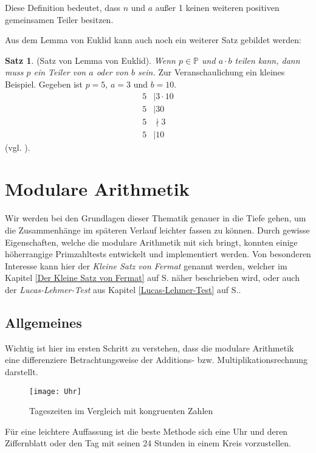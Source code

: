 \documentclass[12pt,a4paper]{article}
\theoremstyle{definition}
\newtheorem{satz}{Satz}[subsection]
\begin{document}
Diese Definition bedeutet, dass $n$ und $a$ außer 1 keinen weiteren positiven gemeinsamen Teiler besitzen.

Aus dem Lemma von Euklid kann auch noch ein weiterer Satz gebildet werden:
\begin{satz}(Satz von Lemma von Euklid).\newline
\textit{Wenn $p \in \mathbb{P}$ und $a \cdot b$ teilen kann, dann muss $p$ ein Teiler von $a$ oder von $b$ sein.}\newline
Zur Veranschaulichung ein kleines Beispiel. Gegeben ist $p = 5$, $a = 3$ und $b = 10$.
\begin{align}
5 &\mid 3 \cdot 10\\
5 &\mid 30\\
5 &\nmid 3\\
5 &\mid 10
\end{align}
(vgl. \cite[247]{Houston2012}).
\end{satz}
\newpage

\section{Modulare Arithmetik}\label{Modulare Arithmetik}
Wir werden bei den Grundlagen dieser Thematik genauer in die Tiefe gehen, um die Zusammenhänge im späteren Verlauf leichter fassen zu können. Durch gewisse Eigenschaften, welche die modulare Arithmetik mit sich bringt, konnten einige höherrangige Primzahltests entwickelt und implementiert werden. Von besonderen Interesse kann hier der \textit{Kleine Satz von Fermat} genannt werden, welcher im Kapitel \ref{Der Kleine Satz von Fermat} auf S. \pageref{Der Kleine Satz von Fermat} näher beschrieben wird, oder auch der \textit{Lucas-Lehmer-Test} aus Kapitel \ref{Lucas-Lehmer-Test} auf S.\pageref{Lucas-Lehmer-Test}.

\subsection{Allgemeines}\label{Allgemeines}
Wichtig ist hier im ersten Schritt zu verstehen, dass die modulare Arithmetik eine differenziere Betrachtungsweise der Additions- bzw. Multiplikationsrechnung darstellt.
\begin{figure}[h]
 \centering
 \texttt{[image: Uhr]}
 \caption{Tageszeiten im Vergleich mit kongruenten Zahlen}
 \label{fig:Tageszeiten im Vergleich mit kongruenten Zahlen}
 \autocite[298]{Meinel2011}
\end{figure}
Für eine leichtere Auffassung ist die beste Methode sich eine Uhr und deren Ziffernblatt oder den Tag mit seinen 24 Stunden in einem Kreis vorzustellen.
\end{document}
